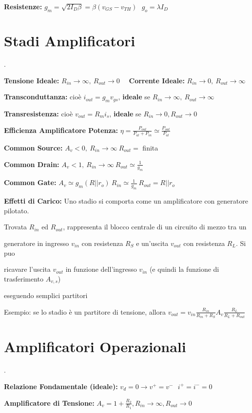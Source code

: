 \documentclass[12pt]{extarticle}
\begin{document}
{\bf Resistenze:} $\displaystyle g_m = \sqrt{2I_D\beta} = \beta(v_{GS}-v_{TH})\ \ \ g_o = \lambda I_D$

\section{Stadi Amplificatori}.

{\bf Tensione Ideale:} $R_{in} \to \infty, \ R_{out} \to 0 $ \ \ {\bf Corrente Ideale:} $R_{in} \to 0, \ R_{out} \to \infty $ 

{\bf Transconduttanza:} cioè $ i_{out} = g_mv_{gs} $, {\bf ideale} se $R_{in} \to \infty, \ R_{out} \to \infty$

{\bf Transresistenza:} cioè $ v_{out} = R_mi_s$, {\bf ideale} se $R_{in} \to 0, R_{out} \to 0$ 

{\bf Efficienza Amplificatore Potenza:} $\displaystyle \eta = \frac{P_{out}}{P_{al}+P_{in}} \simeq \frac{P_{out}}{P_{al}}$ 

{\bf Common Source:} $ A_v < 0, \ R_{in} \to \infty \ R_{out} = $ finita 

{\bf Common Drain:} $ A_v < 1, \ R_{in} \to \infty \ R_{out} \simeq \frac{1}{g_m}$	

{\bf Common Gate:} $ A_v \simeq g_m(R || r_o) \ R_{in} \simeq \frac{1}{g_m} \ R_{out} = R || r_o$

{\bf Effetti di Carico:} Uno stadio si comporta come un amplificatore con generatore pilotato.

Trovata $R_{in}$ ed $R_{out}$, rappresenta il blocco centrale di un circuito di mezzo tra un 

generatore in ingresso $v_{in}$ con resistenza $R_S$ e un'uscita $v_{out}$ con resistenza $R_L$. Si puo

ricavare l'uscita $v_{out}$ in funzione dell'ingresso $v_{in}$ (e quindi la funzione di trasferimento $A_{v,s}$)

eseguendo semplici partitori 

Esempio: se lo stadio è un partitore di tensione, allora $\displaystyle v_{out} = v_{in}\frac{R_{in}}{R_{in}+R_S}A_v\frac{R_L}{R_L+R_{out}}$


\section{Amplificatori Operazionali}.

{\bf Relazione Fondamentale (ideale):} $\displaystyle v_d = 0 \to v^+ = v^- \ \ \ i^+ = i^- = 0$

{\bf Amplificatore di Tensione:} $\displaystyle A_v = 1+\frac{R_2}{R_1}, R_{in} \to \infty, R_{out} \to 0$
\end{document}

